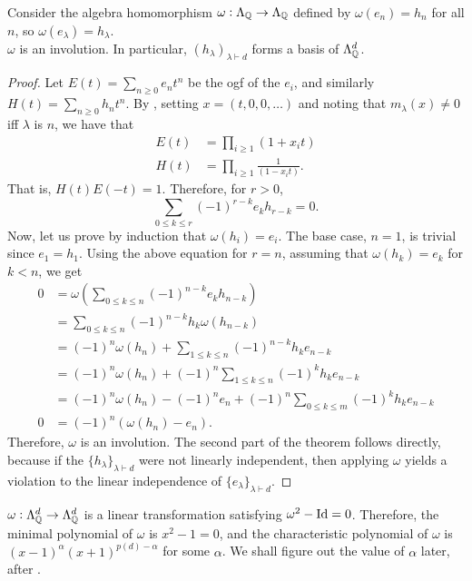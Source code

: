 	\begin{ftheo}
		\label{theo: h basis}
		Consider the algebra homomorphism $\omega : \Lambda_{\mathbb{Q}} \to \Lambda_{\mathbb{Q}}$ defined by $\omega(e_n) = h_n$ for all $n$, so $\omega(e_\lambda) = h_\lambda$.\\
		$\omega$ is an involution. In particular, $(h_\lambda)_{\lambda \vdash d}$ forms a basis of $\Lambda_{\mathbb{Q}}^d$.
	\end{ftheo}
	\begin{proof}
		Let $E(t) = \sum_{n \ge 0} e_n t^n$ be the ogf of the $e_i$, and similarly $H(t) = \sum_{n \ge 0} h_n t^n$. By , setting $x = (t,0,0,\ldots)$ and noting that $m_\lambda(x) \ne 0$ iff $\lambda$ is $n$, we have that
		\begin{align*}
			E(t) &= \prod_{i \ge 1} (1+x_it) \\
			H(t) &= \prod_{i \ge 1} \frac{1}{(1-x_it)}.
		\end{align*}
		That is, $H(t) E(-t) = 1$. Therefore, for $r > 0$,
		\[ \sum_{0 \le k \le r} (-1)^{r-k} e_k h_{r-k} = 0. \]
		Now, let us prove by induction that $\omega(h_i) = e_i$. The base case, $n = 1$, is trivial since $e_1 = h_1$. Using the above equation for $r = n$, assuming that $\omega(h_k) = e_k$ for $k < n$, we get
		\begin{align*}
			0 &= \omega\left(\sum_{0 \le k \le n} (-1)^{n-k} e_k h_{n-k}\right) \\
				&= \sum_{0 \le k \le n} (-1)^{n-k} h_k \omega(h_{n-k}) \\
				&= (-1)^{n}\omega(h_n) + \sum_{1 \le k \le n} (-1)^{n-k} h_k e_{n-k} \\
				&= (-1)^{n}\omega(h_n) + (-1)^n \sum_{1 \le k \le n} (-1)^{k} h_k e_{n-k} \\
				&= (-1)^n \omega(h_n) - (-1)^n e_n + (-1)^n \sum_{0 \le k \le m} (-1)^k h_k e_{n-k} \\
			0 &= (-1)^n (\omega(h_n) - e_n).
		\end{align*}
		Therefore, $\omega$ is an involution. The second part of the theorem follows directly, because if the $\{h_\lambda\}_{\lambda \vdash d}$ were not linearly independent, then applying $\omega$ yields a violation to the linear independence of $\{e_\lambda\}_{\lambda \vdash d}$.
	\end{proof}

	\begin{remark}
		$\omega : \Lambda_{\mathbb{Q}}^d \to \Lambda_{\mathbb{Q}}^d$ is a linear transformation satisfying $\omega^2 - \operatorname{Id} = 0$. Therefore, the minimal polynomial of $\omega$ is $x^2 - 1 = 0$, and the characteristic polynomial of $\omega$ is $(x-1)^\alpha (x+1)^{p(d) - \alpha}$ for some $\alpha$. We shall figure out the value of $\alpha$ later, after .
	\end{remark}

